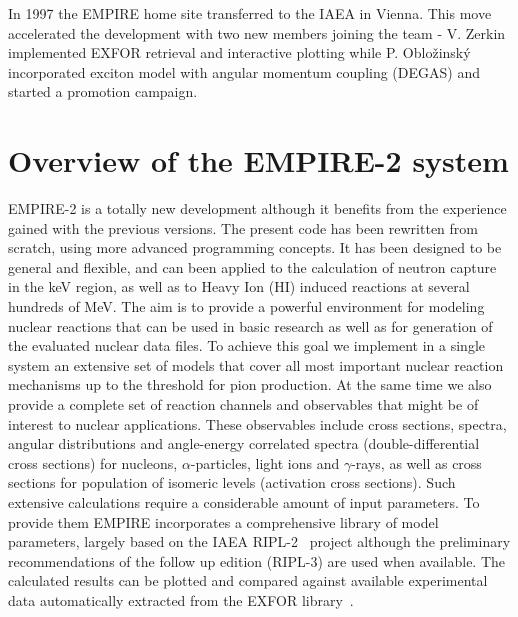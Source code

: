 In 1997 the EMPIRE home site transferred to the IAEA in Vienna. This move
accelerated the development with two new members joining the team - V.
Zerkin implemented EXFOR retrieval and interactive plotting while P. Oblo\v
zinsk\'y incorporated exciton model with angular momentum coupling (DEGAS)
and started a promotion campaign.

\section{Overview of the EMPIRE-2 system}

EMPIRE-2 is a totally new development although it benefits from the
experience gained with the previous versions. The present code has been
rewritten from scratch, using more advanced programming concepts. It has
been designed to be general and flexible, and can been applied to the
calculation of neutron capture in the keV region, as well as to Heavy Ion
(HI) induced reactions at several hundreds of MeV. The aim is to provide a
powerful environment for modeling nuclear reactions that can be used in
basic research as well as for generation of the evaluated nuclear data
files. To achieve this goal we implement in a single system an extensive set
of models that cover all most important nuclear reaction mechanisms up to
the threshold for pion production. At the same time we also provide a
complete set of reaction channels and observables that might be of interest
to nuclear applications. These observables include cross sections, spectra,
angular distributions and angle-energy correlated spectra
(double-differential cross sections) for nucleons, $\alpha$-particles, light
ions and $\gamma$-rays, as well as cross sections for population of isomeric
levels (activation cross sections). Such extensive calculations require a
considerable amount of input parameters. To provide them EMPIRE incorporates
a comprehensive library of model parameters, largely based on the IAEA
RIPL-2~\cite{RIPL-2} project although the preliminary recommendations of the
follow up edition (RIPL-3) are used when available. The calculated results
can be plotted and compared against available experimental data
automatically extracted from the EXFOR library~\cite{EXFOR}.

